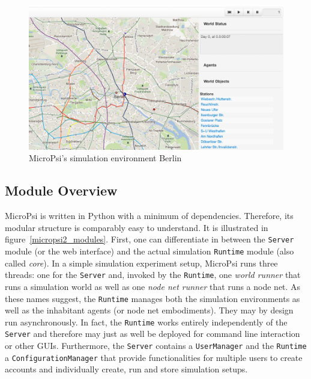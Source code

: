 \begin{figure}[h]
  \centering
    \includegraphics[width=14cm]{graphics/mp2_berlin}
  \caption{MicroPsi's simulation environment Berlin}
  \label{mp2_berlin}
\end{figure}

        \subsection{Module Overview}
                
MicroPsi is written in Python with a minimum of dependencies. Therefore, its  modular structure is comparably easy to understand. It is illustrated in figure~\ref{micropsi2_modules}. First, one can differentiate in between the \texttt{Server} module (or the web interface) and the actual simulation \texttt{Runtime} module (also called \emph{core}). In a simple simulation experiment setup, MicroPsi runs three threads: one for the \texttt{Server} and, invoked by the \texttt{Runtime}, one \emph{world runner} that runs a simulation world as well as one \emph{node net runner} that runs a node net. As these names suggest, the \texttt{Runtime} manages both the simulation environments as well as the inhabitant agents (or node net embodiments). They may by design run asynchronously. In fact, the \texttt{Runtime} works entirely independently of the \texttt{Server} and therefore may just as well be deployed for command line interaction or other GUIs. Furthermore, the \texttt{Server} contains a \texttt{UserManager} and the \texttt{Runtime} a \texttt{ConfigurationManager} that provide functionalities for multiple users to create accounts and individually create, run and store simulation setups.~\cite{conf/agi/Bach12}
          
